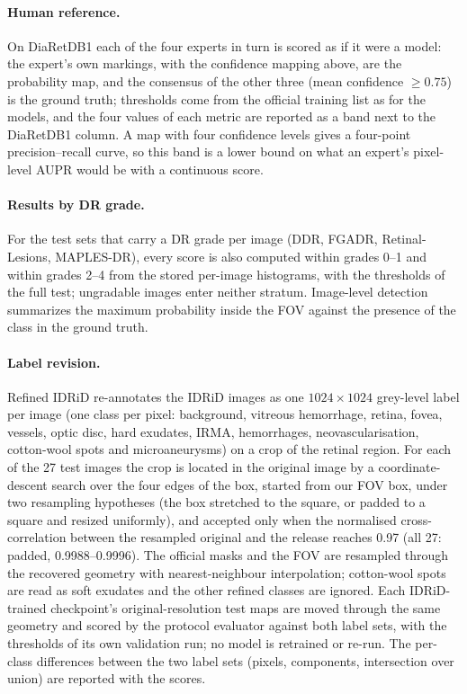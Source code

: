 \paragraph{Human reference.} On DiaRetDB1 each of the four experts in turn is scored as if it were a model: the expert's own markings, with the confidence mapping above, are the probability map, and the consensus of the other three (mean confidence $\geq0.75$) is the ground truth; thresholds come from the official training list as for the models, and the four values of each metric are reported as a band next to the DiaRetDB1 column. A map with four confidence levels gives a four-point precision--recall curve, so this band is a lower bound on what an expert's pixel-level AUPR would be with a continuous score.

\paragraph{Results by DR grade.} For the test sets that carry a DR grade per image (DDR, FGADR, Retinal-Lesions, MAPLES-DR), every score is also computed within grades 0--1 and within grades 2--4 from the stored per-image histograms, with the thresholds of the full test; ungradable images enter neither stratum. Image-level detection summarizes the maximum probability inside the FOV against the presence of the class in the ground truth.

\paragraph{Label revision.} Refined IDRiD\cite{chankhachon2026refinedidrid} re-annotates the IDRiD images as one $1024\times1024$ grey-level label per image (one class per pixel: background, vitreous hemorrhage, retina, fovea, vessels, optic disc, hard exudates, IRMA, hemorrhages, neovascularisation, cotton-wool spots and microaneurysms) on a crop of the retinal region. For each of the 27 test images the crop is located in the original image by a coordinate-descent search over the four edges of the box, started from our FOV box, under two resampling hypotheses (the box stretched to the square, or padded to a square and resized uniformly), and accepted only when the normalised cross-correlation between the resampled original and the release reaches 0.97 (all 27: padded, 0.9988--0.9996). The official masks and the FOV are resampled through the recovered geometry with nearest-neighbour interpolation; cotton-wool spots are read as soft exudates and the other refined classes are ignored. Each IDRiD-trained checkpoint's original-resolution test maps are moved through the same geometry and scored by the protocol evaluator against both label sets, with the thresholds of its own validation run; no model is retrained or re-run. The per-class differences between the two label sets (pixels, components, intersection over union) are reported with the scores.


